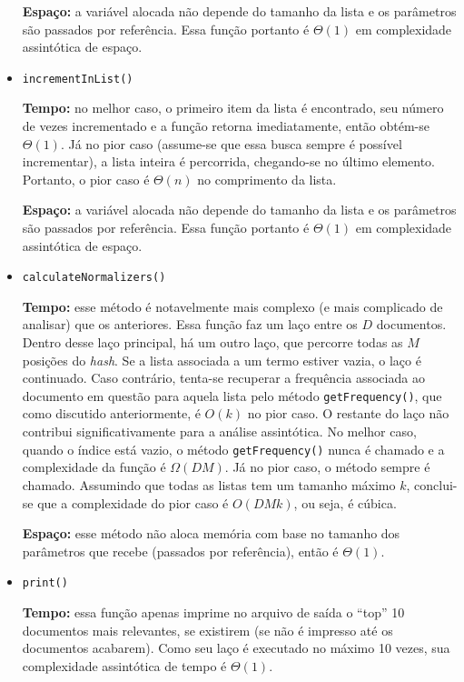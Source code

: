 \documentclass{article}
\def\code#1{\texttt{#1}}
\begin{document}
\begin{itemize}
	      \textbf{Espaço:} a variável alocada não depende do tamanho da lista e os parâmetros são passados por referência. Essa função portanto é \( \Theta(1) \) em complexidade assintótica de espaço.

	\item \code{incrementInList()}

	      \textbf{Tempo:} no melhor caso, o primeiro item da lista é encontrado, seu número de vezes incrementado e a função retorna imediatamente, então obtém-se \( \Theta(1) \). Já no pior caso (assume-se que essa busca sempre é possível incrementar), a lista inteira é percorrida, chegando-se no último elemento. Portanto, o pior caso é \( \Theta(n) \) no comprimento da lista.

	      \textbf{Espaço:} a variável alocada não depende do tamanho da lista e os parâmetros são passados por referência. Essa função portanto é \( \Theta(1) \) em complexidade assintótica de espaço.

	\item \code{calculateNormalizers()}

	      \textbf{Tempo:} esse método é notavelmente mais complexo (e mais complicado de analisar) que os anteriores. Essa função faz um laço entre os \( D \) documentos. Dentro desse laço principal, há um outro laço, que percorre todas as \( M \) posições do \textit{hash}. Se a lista associada a um termo estiver vazia, o laço é continuado. Caso contrário, tenta-se recuperar a frequência associada ao documento em questão para aquela lista pelo método \code{getFrequency()}, que como discutido anteriormente, é \( O(k) \) no pior caso. O restante do laço não contribui significativamente para a análise assintótica. No melhor caso, quando o índice está vazio, o método \code{getFrequency()} nunca é chamado e a complexidade da função é \( \Omega(DM) \). Já no pior caso, o método sempre é chamado. Assumindo que todas as listas tem um tamanho máximo \( k \), conclui-se que a complexidade do pior caso é \( O(DMk) \), ou seja, é cúbica.

	      \textbf{Espaço:} esse método não aloca memória com base no tamanho dos parâmetros que recebe (passados por referência), então é \( \Theta(1) \).

	\item \code{print()}

	      \textbf{Tempo:} essa função apenas imprime no arquivo de saída o ``top'' 10 documentos mais relevantes, se existirem (se não é impresso até os documentos acabarem). Como seu laço é executado no máximo 10 vezes, sua complexidade assintótica de tempo é \( \Theta(1) \).


\end{itemize}
\end{document}
